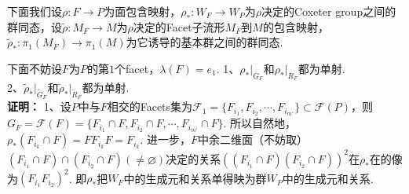 \documentclass{article}
\theoremstyle{plain}%
\theoremstyle{definition}
\theoremstyle{remark}
\begin{document}
{下面我们设$\rho:F\longrightarrow P$为面包含映射，$\rho_*:W_F\longrightarrow W_P$为$\rho$决定的Coxeter group之间的群同态，设$\widetilde{\rho}:M_F\longrightarrow M$为$\rho$决定的Facet子流形$M_F$到$M$的包含映射，$\widetilde{\rho}_*:\pi_1(M_F)\longrightarrow\pi_1(M)$为它诱导的基本群之间的群同态.

下面不妨设$F$为$P$的第$1$个facet，$\lambda(F)=e_1$.
{\lem \label{lemm}
1、$\rho_*|_{G_F}$和$\rho_*|_{R_F}$都为单射.\\
2、$\widetilde{\rho}_*|_{\widetilde{G}_F}$和$\widetilde{\rho}_*|_{\widetilde{R}_F}$都为单射.\\
}
{\bf 证明：}
1、设$P$中与$F$相交的Facets集为$\mathcal{F}_1=\{F_{i_1},F_{i_2},\cdots,F_{i_{m'}}\}\subset \mathcal{F}(P)$，则$G_F=\mathcal{F}(F)=\{F_{i_1}\cap F,F_{i_2}\cap F,\cdots,F_{i_{m'}}\cap F\}$. 所以自然地，$\rho_{*}(F_{i_k}\cap F)=FF_{i_k}F=F_{i_k}$. 进一步，$F$中余二维面（不妨取）$(F_{i_{1}}\cap F)\cap (F_{i_{2}}\cap F)(\neq\varnothing)$决定的关系$((F_{i_{1}}\cap F)(F_{i_{2}}\cap F))^2$在$\rho_{*}$在的像为$(F_{i_{1}}F_{i_{2}})^2$. 
即$\rho_{*}$把$W_F$中的生成元和关系单得映为群$W_P$中的生成元和关系. 
\begin{figure}[h]
\centering
\def\svgwidth{0.55\textwidth}

\end{figure}

}
\end{document}
